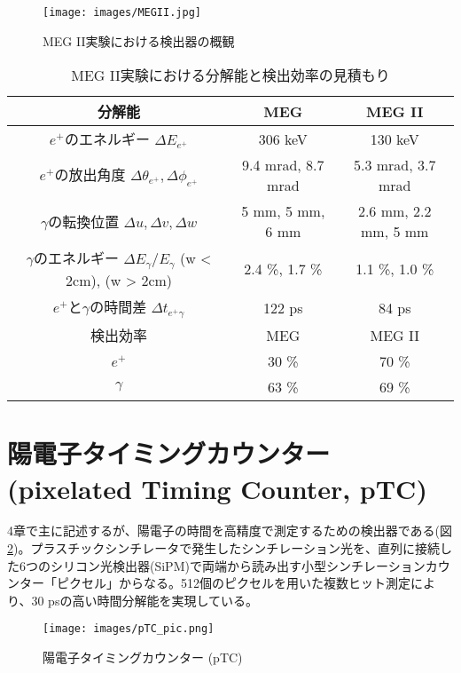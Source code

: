 \documentclass[Yonemoto_master.tex]{subfiles}
\begin{document}
\begin{figure}[h]
\begin{center}
\texttt{[image: images/MEGII.jpg]}
\caption{MEG II実験における検出器の概観}
\label{fig: MEG II}
\end{center}
\end{figure}

\begin{table}[h]
 \centering
 \caption{MEG II実験における分解能と検出効率の見積もり \cite{MEG} \cite{MEGII}}
 \label{tab: megii_exp}
  \begin{tabular}{ccc}
   \hline
   分解能 & MEG & MEG II \\
   \hline
   \hline
   $e^+$のエネルギー $\Delta E_{e^+}$ & 306 keV & 130 keV\\
   $e^+$の放出角度 $\Delta \theta_{e^+}, \Delta \phi_{e^+} $ & 9.4 mrad, 8.7 mrad & 5.3 mrad, 3.7 mrad \\
   $\gamma$の転換位置 $\Delta u, \Delta v, \Delta w $ & 5 mm, 5 mm, 6 mm & 2.6 mm, 2.2 mm, 5 mm \\
   $\gamma$のエネルギー $\Delta E_{\gamma} / E_{\gamma}$ (w < 2cm), (w > 2cm) & 2.4 \%, 1.7 \%  & 1.1 \%, 1.0 \% \\
   $e^+$と$\gamma$の時間差 $\Delta t_{e^+\gamma}$ & 122 ps & 84 ps \\
   \hline
   検出効率 & MEG & MEG II \\
   \hline
   \hline
   $e^+$ & 30 \% & 70 \% \\
   $\gamma$ & 63 \% & 69 \% \\
   \hline
  \end{tabular}
\end{table}


\section{陽電子タイミングカウンター (pixelated Timing Counter, pTC)}
\label{sec: ptc}
4章で主に記述するが、陽電子の時間を高精度で測定するための検出器である(図\ref{fig: pTC_pic})。プラスチックシンチレータで発生したシンチレーション光を、直列に接続した6つのシリコン光検出器(SiPM)で両端から読み出す小型シンチレーションカウンター「ピクセル」からなる。512個のピクセルを用いた複数ヒット測定により、$30$ psの高い時間分解能を実現している。
\begin{figure}[h]
\begin{center}
\texttt{[image: images/pTC\_pic.png]}
\caption{陽電子タイミングカウンター (pTC)}
\label{fig: pTC_pic}
\end{center}
\end{figure}
\end{document}
